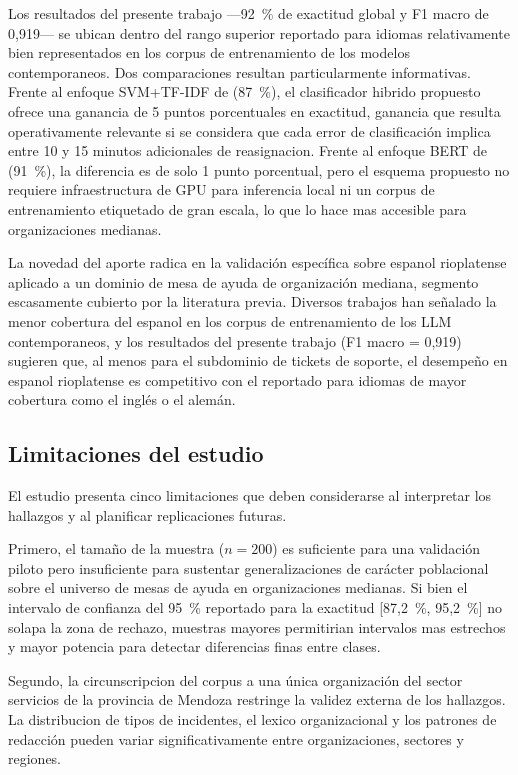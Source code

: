 Los resultados del presente trabajo ---92~\% de exactitud global y F1 macro de 0,919--- se ubican dentro del rango superior reportado para idiomas relativamente bien representados en los corpus de entrenamiento de los modelos contemporaneos. Dos comparaciones resultan particularmente informativas. Frente al enfoque SVM+TF-IDF de \textcite{Paramesh2019_it_service_desk} (87~\%), el clasificador hibrido propuesto ofrece una ganancia de 5 puntos porcentuales en exactitud, ganancia que resulta operativamente relevante si se considera que cada error de clasificación implica entre 10 y 15 minutos adicionales de reasignacion. Frente al enfoque BERT de \textcite{Revina2020_bert_tickets} (91~\%), la diferencia es de solo 1 punto porcentual, pero el esquema propuesto no requiere infraestructura de GPU para inferencia local ni un corpus de entrenamiento etiquetado de gran escala, lo que lo hace mas accesible para organizaciones medianas.

La novedad del aporte radica en la validación específica sobre espanol rioplatense aplicado a un dominio de mesa de ayuda de organización mediana, segmento escasamente cubierto por la literatura previa. Diversos trabajos han señalado la menor cobertura del espanol en los corpus de entrenamiento de los LLM contemporaneos, y los resultados del presente trabajo (F1 macro = 0,919) sugieren que, al menos para el subdominio de tickets de soporte, el desempeño en espanol rioplatense es competitivo con el reportado para idiomas de mayor cobertura como el inglés o el alemán.

\subsection{Limitaciones del estudio}

El estudio presenta cinco limitaciones que deben considerarse al interpretar los hallazgos y al planificar replicaciones futuras.

Primero, el tamaño de la muestra (\(n = 200\)) es suficiente para una validación piloto pero insuficiente para sustentar generalizaciones de carácter poblacional sobre el universo de mesas de ayuda en organizaciones medianas. Si bien el intervalo de confianza del 95~\% reportado para la exactitud [87,2~\%, 95,2~\%] no solapa la zona de rechazo, muestras mayores permitirian intervalos mas estrechos y mayor potencia para detectar diferencias finas entre clases.

Segundo, la circunscripcion del corpus a una única organización del sector servicios de la provincia de Mendoza restringe la validez externa de los hallazgos. La distribucion de tipos de incidentes, el lexico organizacional y los patrones de redacción pueden variar significativamente entre organizaciones, sectores y regiones.

